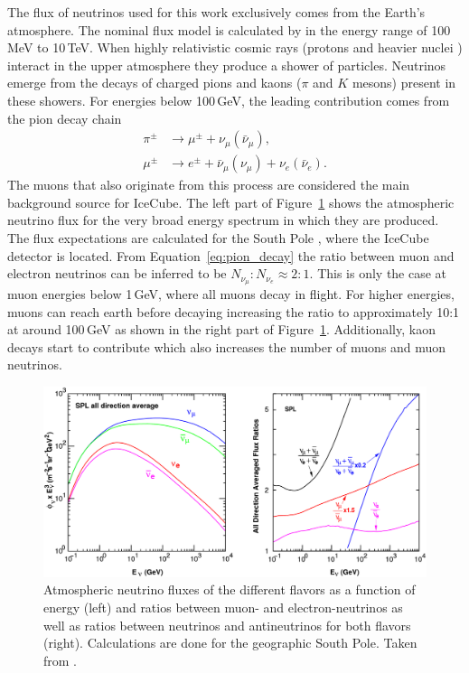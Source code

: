 The flux of neutrinos used for this work exclusively comes from the Earth's atmosphere.
The nominal flux model is calculated by \cite{PhysRevD.92.023004_Honda_Flux} in the energy range of 100\,MeV to 10\,TeV.
When highly relativistic cosmic rays (protons and heavier nuclei \cite{PhysRevD.98.030001}) interact in  the upper atmosphere they produce a shower of particles. 
Neutrinos emerge from the decays of charged pions and kaons ($\pi$ and $K$ mesons) present in these showers.
For energies below 100\,GeV, the leading contribution comes from the pion decay chain
\begin{equation}
    \begin{split}   
        \pi^\pm &\rightarrow \mu^\pm + \nu_\mu(\bar{\nu}_\mu), \\
        \mu^\pm &\rightarrow e^\pm + \bar{\nu}_\mu(\nu_\mu) + \nu_e(\bar{\nu}_e).
    \end{split}
    \label{eq:pion_decay}
\end{equation}
The muons that also originate from this process are considered the main background source for IceCube.
The left part of Figure~\ref{fig:honda_flux} shows the atmospheric neutrino flux for the very broad energy spectrum in which they are produced.
The flux expectations are calculated for the South Pole \cite{PhysRevD.92.023004_Honda_Flux}, where the IceCube detector is located.
From Equation~\eqref{eq:pion_decay} the ratio between muon and electron neutrinos can be inferred to be $N_{\nu_\mu}:N_{\nu_e} \approx 2:1$.
This is only the case at muon energies below 1\,GeV, where all muons decay in flight.
For higher energies, muons can reach earth before decaying increasing the ratio to approximately 10:1 at around 100\,GeV as shown in the right part of Figure~\ref{fig:honda_flux}.
Additionally, kaon decays start to contribute which also increases the number of muons and muon neutrinos.

\begin{figure}[h]
    \centering
    \includegraphics[width=1.0\textwidth]{figures/Honda_alldir-spl_copy.pdf}
    \caption[Atmospheric neutrino fluxes, taken from \cite{PhysRevD.92.023004_Honda_Flux}]{Atmospheric neutrino fluxes of the different flavors as a function of energy (left) and ratios between muon- and electron-neutrinos as well as ratios between neutrinos and antineutrinos for both flavors (right). Calculations are done for the geographic South Pole. Taken from \cite{PhysRevD.92.023004_Honda_Flux}.}
    \label{fig:honda_flux}
\end{figure}

